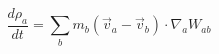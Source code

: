 \documentclass[12pt]{article}
\begin{document}
$$
   \frac{d\rho_a}{dt} = \sum_b m_b \left( \vec{v}_a - \vec{v}_b \right) \cdot \nabla_a W_{ab}
$$
\end{document}
